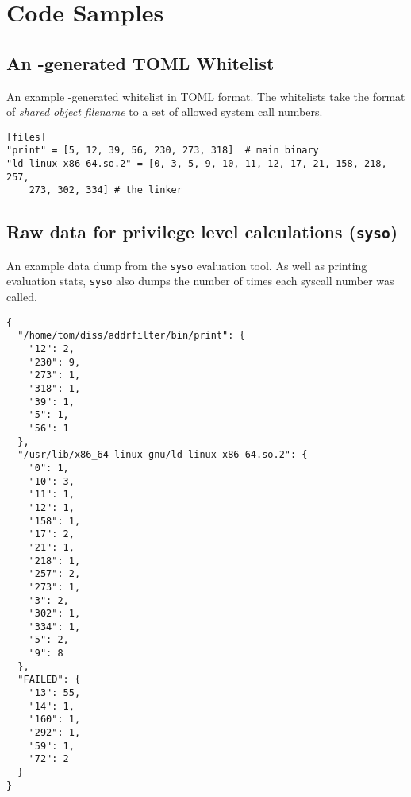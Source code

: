 \appendix
\section{Code Samples}


\subsection{An \afss-generated TOML Whitelist}

\begin{listing}[H]
  \caption{An example \afss-generated whitelist in TOML
  format. The whitelists take the format of \textit{shared object filename} to a
set of allowed system call numbers.}\label{lst:toml-whitelist}
  \begin{verbatim}
[files]
"print" = [5, 12, 39, 56, 230, 273, 318]  # main binary
"ld-linux-x86-64.so.2" = [0, 3, 5, 9, 10, 11, 12, 17, 21, 158, 218, 257,
    273, 302, 334] # the linker
  \end{verbatim}
\end{listing}

\subsection{Raw data for privilege level calculations (\texttt{syso})}
\begin{listing}[H]
    \caption{An example data dump from the \texttt{syso} evaluation tool. As
    well as printing evaluation stats, \texttt{syso} also dumps the number of
times each syscall number was called.}\label{lst:syso-data-dump}
  \begin{verbatim}
{
  "/home/tom/diss/addrfilter/bin/print": {
    "12": 2,
    "230": 9,
    "273": 1,
    "318": 1,
    "39": 1,
    "5": 1,
    "56": 1
  },
  "/usr/lib/x86_64-linux-gnu/ld-linux-x86-64.so.2": {
    "0": 1,
    "10": 3,
    "11": 1,
    "12": 1,
    "158": 1,
    "17": 2,
    "21": 1,
    "218": 1,
    "257": 2,
    "273": 1,
    "3": 2,
    "302": 1,
    "334": 1,
    "5": 2,
    "9": 8
  },
  "FAILED": {
    "13": 55,
    "14": 1,
    "160": 1,
    "292": 1,
    "59": 1,
    "72": 2
  }
}
  \end{verbatim}
\end{listing}

